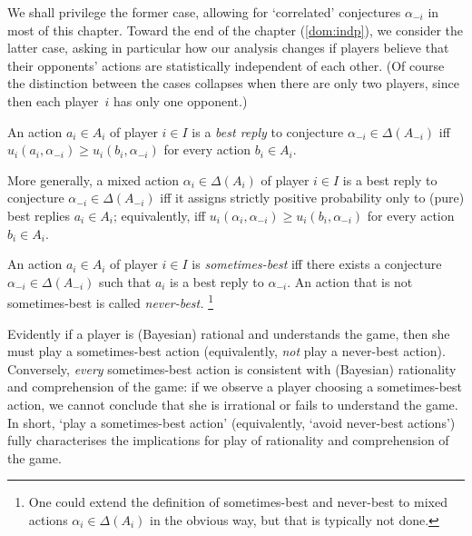 We shall privilege the former case, allowing for `correlated' conjectures $\alpha_{-i}$ in most of this chapter. Toward the end of the chapter (\cref{dom:indp}), we consider the latter case, asking in particular how our analysis changes if players believe that their opponents' actions are statistically independent of each other. (Of course the distinction between the cases collapses when there are only two players, since then each player~$i$ has only one opponent.)

\begin{definition}
	\label{definition:br}
	An action $a_i \in A_i$ of player $i \in I$ is a \emph{best reply} to conjecture $\alpha_{-i} \in \Delta(A_{-i})$ iff $u_i(a_i,\alpha_{-i}) \geq u_i(b_i,\alpha_{-i})$ for every action $b_i \in A_i$.
\end{definition}

More generally, a mixed action $\alpha_i \in \Delta(A_i)$ of player $i \in I$ is a best reply to conjecture $\alpha_{-i} \in \Delta(A_{-i})$ iff it assigns strictly positive probability only to (pure) best replies $a_i \in A_i$; equivalently, iff $u_i(\alpha_i,\alpha_{-i}) \geq u_i(b_i,\alpha_{-i})$ for every action $b_i \in A_i$.


\begin{definition}
	\label{definition:sbr}
	An action $a_i \in A_i$ of player $i \in I$ is \emph{sometimes-best} iff there exists a conjecture $\alpha_{-i} \in \Delta(A_{-i})$ such that $a_i$ is a best reply to $\alpha_{-i}$. An action that is not sometimes-best is called \emph{never-best.}%
		\footnote{One could extend the definition of sometimes-best and never-best to mixed actions $\alpha_i \in \Delta(A_i)$ in the obvious way, but that is typically not done.}
\end{definition}

Evidently if a player is (Bayesian) rational and understands the game, then she must play a sometimes-best action (equivalently, \emph{not} play a never-best action). Conversely, \emph{every} sometimes-best action is consistent with (Bayesian) rationality and comprehension of the game: if we observe a player choosing a sometimes-best action, we cannot conclude that she is irrational or fails to understand the game. In short, `play a sometimes-best action' (equivalently, `avoid never-best actions') fully characterises the implications for play of rationality and comprehension of the game.

